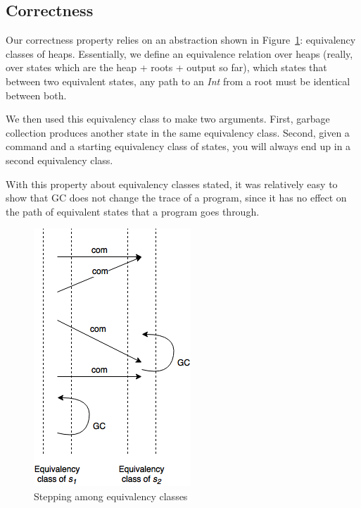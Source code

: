 \documentclass{article}
\begin{document}
\subsection{Correctness}
Our correctness property relies on an abstraction shown in Figure~\ref{fig:equiv}: equivalency classes of heaps. Essentially, we define an equivalence relation over heaps (really, over states which are the heap + roots + output so far), which states that between two equivalent states, any path to an \emph{Int} from a root must be identical between both.

We then used this equivalency class to make two arguments. First, garbage collection produces another state in the same equivalency class. Second, given a command and a starting equivalency class of states, you will always end up in a second equivalency class.

With this property about equivalency classes stated, it was relatively easy to show that GC does not change the trace of a program, since it has no effect on the path of equivalent states that a program goes through.

\begin{figure}[H]
    \centering
    \includegraphics[height=0.4\textheight]{images/equiv}
    \caption{Stepping among equivalency classes}
    \label{fig:equiv}
\end{figure}
\end{document}
